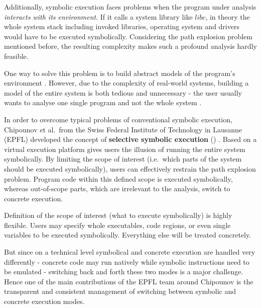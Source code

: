 Additionally, symbolic execution faces problems when the program under analysis \textit{interacts with its environment}.
If it calls a system library like $libc$, in theory the whole system stack including invoked libraries, operating system and drivers would have to be executed symbolically.
Considering the path explosion problem mentioned before, the resulting complexity makes such a profound analysis hardly feasible.

One way to solve this problem is to build abstract models of the program's environment .
However, due to the complexity of real-world systems, building a model of the entire system is both tedious and unnecessary - the user usually wants to analyse one single program and not the whole system \cite{chip09sel}.

\bigskip

In order to overcome typical problems of conventional symbolic execution, Chipounov et al.~from the Swiss Federal Institute of Technology in Lausanne (EPFL) developed the concept of \textbf{selective symbolic execution} (\sse) \cite{chip09sel}.
Based on a virtual execution platform \sse gives users the illusion of running the entire system symbolically.
By limiting the scope of interest (i.e.~which parts of the system should be executed symbolically), users can effectively restrain the path explosion problem.
Program code within this defined scope is executed symbolically, whereas out-of-scope parts, which are irrelevant to the analysis, switch to concrete execution.


Definition of the scope of interest (what to execute symbolically) is highly flexible.
Users may specify whole executables, code regions, or even single variables to be executed symbolically. Everything else will be treated concretely.

But since on a technical level symbolical and concrete execution are handled very differently - concrete code may run natively while symbolic instructions need to be emulated - switching back and forth these two modes is a major challenge.
Hence one of the main contributions of the EPFL team around Chipounov is the transparent and consistent management of switching between symbolic and concrete execution modes.

